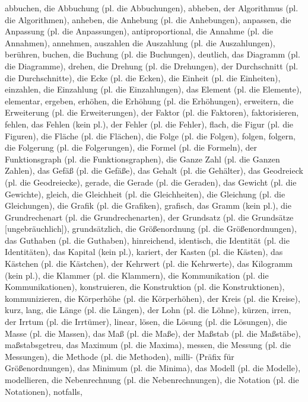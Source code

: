 abbuchen,
die Abbuchung (pl. die Abbuchungen),
abheben,
der Algorithmus (pl. die Algorithmen),
anheben,
die Anhebung (pl. die Anhebungen),
anpassen,
die Anpassung (pl. die Anpassungen),
antiproportional,
die Annahme (pl. die Annahmen),
annehmen,
auszahlen
die Auszahlung (pl. die Auszahlungen),
berühren,
buchen,
die Buchung (pl. die Buchungen),
deutlich,
das Diagramm (pl. die Diagramme),
drehen,
die Drehung (pl. die Drehungen),
der Durchschnitt (pl. die Durchschnitte),
die Ecke (pl. die Ecken),
die Einheit (pl. die Einheiten),
einzahlen,
die Einzahlung (pl. die Einzahlungen),
das Element (pl. die Elemente),
elementar,
ergeben,
erhöhen,
die Erhöhung (pl. die Erhöhungen),
erweitern,
die Erweiterung (pl. die Erweiterungen),
der Faktor (pl. die Faktoren),
faktorisieren,
fehlen,
das Fehlen (kein pl.),
der Fehler (pl. die Fehler),
flach,
die Figur (pl. die Figuren),
die Fläche (pl. die Flächen),
die Folge (pl. die Folgen),
folgen,
folgern,
die Folgerung (pl. die Folgerungen),
die Formel (pl. die Formeln),
der Funktionsgraph (pl. die Funktionsgraphen),
die Ganze Zahl (pl. die Ganzen Zahlen),
das Gefäß (pl. die Gefäße),
das Gehalt (pl. die Gehälter),
das Geodreieck (pl. die Geodreiecke),
gerade,
die Gerade (pl. die Geraden),
das Gewicht (pl. die Gewichte),
gleich,
die Gleichheit (pl. die Gleichheiten),
die Gleichung (pl. die Gleichungen),
die Grafik (pl. die Grafiken),
grafisch,
das Gramm (kein pl.),
die Grundrechenart (pl. die Grundrechenarten),
der Grundsatz (pl. die Grundsätze [ungebräuchlich]),
grundsätzlich,
die Größenordnung (pl. die Größenordnungen),
das Guthaben (pl. die Guthaben),
hinreichend,
identisch,
die Identität (pl. die Identitäten),
das Kapital (kein pl.),
kariert,
der Kasten (pl. die Kästen),
das Kästchen (pl. die Kästchen),
der Kehrwert (pl. die Kehrwerte),
das Kilogramm (kein pl.),
die Klammer (pl. die Klammern),
die Kommunikation (pl. die Kommunikationen),
konstruieren,
die Konstruktion (pl. die Konstruktionen),
kommunizieren,
die Körperhöhe (pl. die Körperhöhen),
der Kreis (pl. die Kreise),
kurz,
lang,
die Länge (pl. die Längen),
der Lohn (pl. die Löhne),
kürzen,
irren,
der Irrtum (pl. die Irrtümer),
linear,
lösen,
die Lösung (pl. die Lösungen),
die Masse (pl. die Massen),
das Maß (pl. die Maße),
der Maßstab (pl. die Maßstäbe),
maßstabsgetreu,
das Maximum (pl. die Maxima),
messen,
die Messung (pl. die Messungen),
die Methode (pl. die Methoden),
milli- (Präfix für Größenordnungen),
das Minimum (pl. die Minima),
das Modell (pl. die Modelle),
modellieren,
die Nebenrechnung (pl. die Nebenrechnungen),
die Notation (pl. die Notationen),
notfalls,
